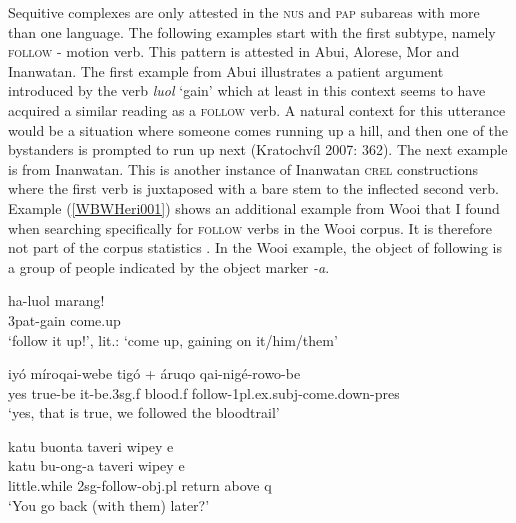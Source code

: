 Sequitive complexes are only attested in the \textsc{nus} and \textsc{pap} subareas with more than one language. The following examples start with the first subtype, namely \textsc{follow} - motion verb. This pattern is attested in Abui, Alorese, Mor and Inanwatan. The first example from Abui illustrates a patient argument introduced by the verb \textit{luol} `gain' which at least in this context seems to have acquired a similar reading as a \textsc{follow} verb. A natural context for this utterance would be a situation where someone comes running up a hill, and then one of the bystanders is prompted to run up next (Kratochvíl 2007: 362). The next example is from Inanwatan. This is another instance of Inanwatan \textsc{crel} constructions where the first verb is juxtaposed with a bare stem to the inflected second verb. Example (\ref{WBWHeri001}) shows an additional example from Wooi that I found when searching specifically for \textsc{follow} verbs in the Wooi corpus. It is therefore not part of the corpus statistics . In the Wooi example, the object of following is a group of people indicated by the object marker \textit{-a}.

\ea \label{Abui059}
\gll ha-luol marang! \\
\acs{3}\acs{pat}-gain come.up \\
\glft `follow it up!’, lit.: `come up, gaining on it/him/them’ \\ 
\z
\xe

\ea \label{Inanwatan026}
\gll iyó míroqai-webe tigó + áruqo qai-nigé-rowo-be \\
yes true-be it-be.\acs{3}\acs{sg}.\acs{f} blood.\acs{f} follow-\acs{1}\acs{pl}.\acs{ex}.\acs{subj}-come.down-\acs{pres} \\
\glft `yes, that is true, we followed the bloodtrail' \\ 
\z
\xe

\ea \label{WBWHeri001}
\gll katu buonta taveri wipey e \\
katu bu-ong-a taveri wipey e \\
\glc little.while \acs{2}\acs{sg}-follow-\acs{obj}.\acs{pl} return above \acs{q} \\
\glft `You go back (with them) later?' \\ 
\z
\xe


